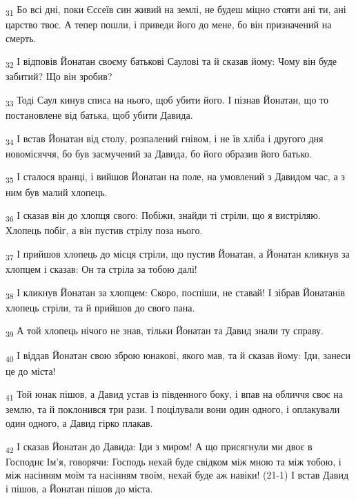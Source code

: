 \begin{tcolorbox}
\textsubscript{31} Бо всі дні, поки Єссеїв син живий на землі, не будеш міцно стояти ані ти, ані царство твоє. А тепер пошли, і приведи його до мене, бо він призначений на смерть.
\end{tcolorbox}
\begin{tcolorbox}
\textsubscript{32} І відповів Йонатан своєму батькові Саулові та й сказав йому: Чому він буде забитий? Що він зробив?
\end{tcolorbox}
\begin{tcolorbox}
\textsubscript{33} Тоді Саул кинув списа на нього, щоб убити його. І пізнав Йонатан, що то постановлене від батька, щоб убити Давида.
\end{tcolorbox}
\begin{tcolorbox}
\textsubscript{34} І встав Йонатан від столу, розпалений гнівом, і не їв хліба і другого дня новомісяччя, бо був засмучений за Давида, бо його образив його батько.
\end{tcolorbox}
\begin{tcolorbox}
\textsubscript{35} І сталося вранці, і вийшов Йонатан на поле, на умовлений з Давидом час, а з ним був малий хлопець.
\end{tcolorbox}
\begin{tcolorbox}
\textsubscript{36} І сказав він до хлопця свого: Побіжи, знайди ті стріли, що я вистріляю. Хлопець побіг, а він пустив стрілу поза нього.
\end{tcolorbox}
\begin{tcolorbox}
\textsubscript{37} І прийшов хлопець до місця стріли, що пустив Йонатан, а Йонатан кликнув за хлопцем і сказав: Он та стріла за тобою далі!
\end{tcolorbox}
\begin{tcolorbox}
\textsubscript{38} І кликнув Йонатан за хлопцем: Скоро, поспіши, не ставай! І зібрав Йонатанів хлопець стріли, та й прийшов до свого пана.
\end{tcolorbox}
\begin{tcolorbox}
\textsubscript{39} А той хлопець нічого не знав, тільки Йонатан та Давид знали ту справу.
\end{tcolorbox}
\begin{tcolorbox}
\textsubscript{40} І віддав Йонатан свою зброю юнакові, якого мав, та й сказав йому: Іди, занеси це до міста!
\end{tcolorbox}
\begin{tcolorbox}
\textsubscript{41} Той юнак пішов, а Давид устав із південного боку, і впав на обличчя своє на землю, та й поклонився три рази. І поцілували вони один одного, і оплакували один одного, а Давид гірко плакав.
\end{tcolorbox}
\begin{tcolorbox}
\textsubscript{42} І сказав Йонатан до Давида: Іди з миром! А що присягнули ми двоє в Господнє Ім'я, говорячи: Господь нехай буде свідком між мною та між тобою, і між насінням моїм та насінням твоїм, нехай буде аж навіки! (21-1) І встав Давид і пішов, а Йонатан пішов до міста.
\end{tcolorbox}
